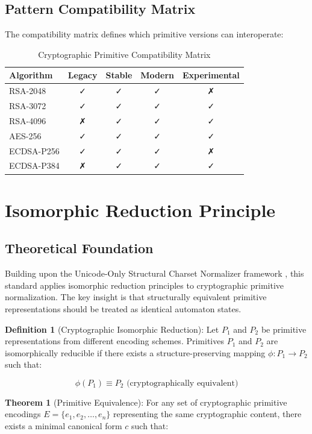 \documentclass[11pt,a4paper]{article}
\begin{document}
\subsection{Pattern Compatibility Matrix}

The compatibility matrix defines which primitive versions can interoperate:

\begin{table}[h]
\centering
\begin{tabular}{|l|c|c|c|c|}
\hline
\textbf{Algorithm} & \textbf{Legacy} & \textbf{Stable} & \textbf{Modern} & \textbf{Experimental} \\
\hline
RSA-2048 & ✓ & ✓ & ✓ & ✗ \\
RSA-3072 & ✓ & ✓ & ✓ & ✓ \\
RSA-4096 & ✗ & ✓ & ✓ & ✓ \\
AES-256 & ✓ & ✓ & ✓ & ✓ \\
ECDSA-P256 & ✓ & ✓ & ✓ & ✗ \\
ECDSA-P384 & ✗ & ✓ & ✓ & ✓ \\
\hline
\end{tabular}
\caption{Cryptographic Primitive Compatibility Matrix}
\end{table}

\section{Isomorphic Reduction Principle}

\subsection{Theoretical Foundation}

Building upon the Unicode-Only Structural Charset Normalizer framework \cite{okpala2025isomorphic}, this standard applies isomorphic reduction principles to cryptographic primitive normalization. The key insight is that structurally equivalent primitive representations should be treated as identical automaton states.

\textbf{Definition 1} (Cryptographic Isomorphic Reduction): Let $P_1$ and $P_2$ be primitive representations from different encoding schemes. Primitives $P_1$ and $P_2$ are isomorphically reducible if there exists a structure-preserving mapping $\phi : P_1 \rightarrow P_2$ such that:

$$\phi(P_1) \equiv P_2 \text{ (cryptographically equivalent)}$$

\textbf{Theorem 1} (Primitive Equivalence): For any set of cryptographic primitive encodings $E = \{e_1, e_2, \ldots, e_n\}$ representing the same cryptographic content, there exists a minimal canonical form $c$ such that:
\end{document}
